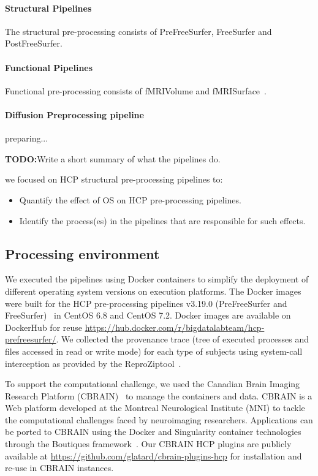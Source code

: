 \documentclass{article}
\newcommand{\todo}[1]{\color{red}\textbf{TODO:}#1\color{black}}
\newcommand{\reprozip}[0]{ReproZip}
\begin{document}
\paragraph{Structural Pipelines} The structural pre-processing consists of PreFreeSurfer, FreeSurfer and PostFreeSurfer. 
\paragraph{Functional Pipelines} Functional pre-processing consists of fMRIVolume and fMRISurface~\cite{FSL}. 
\paragraph{Diffusion Preprocessing pipeline} preparing...

\todo{Write a short summary of what the pipelines do.}

we focused on HCP structural pre-processing pipelines to:
\begin{itemize}
\item Quantify the effect of OS on HCP pre-processing pipelines.
\item Identify the process(es) in the pipelines that are responsible for such effects.
\end{itemize}

\subsection{Processing environment}

We executed the pipelines using Docker
containers to simplify the deployment of different operating
system versions on execution platforms. The Docker images were built for the HCP
 pre-processing pipelines v3.19.0 (PreFreeSurfer and
FreeSurfer)~\cite{Glasser2013} in CentOS 6.8 and CentOS 7.2. Docker images are available on DockerHub for reuse \url{https://hub.docker.com/r/bigdatalabteam/hcp-prefreesurfer/}. We
collected the provenance trace (tree of executed processes and files
accessed in read or write mode) for each type of subjects using system-call
interception as provided by the \reprozip tool~\cite{Chirigati2016}.



To support the computational challenge, we used the Canadian Brain
Imaging Research Platform (CBRAIN)~\cite{cbrain} to manage the
containers and data. CBRAIN is a Web platform developed at the
Montreal Neurological Institute (MNI) to tackle the computational
challenges faced by neuroimaging researchers.  Applications can be
ported to CBRAIN using the Docker and Singularity container
technologies through the Boutiques framework~\cite{boutiques}. Our
CBRAIN HCP plugins are publicly available at \url{https://github.com/glatard/cbrain-plugins-hcp} for
installation and re-use in CBRAIN instances.
\end{document}
